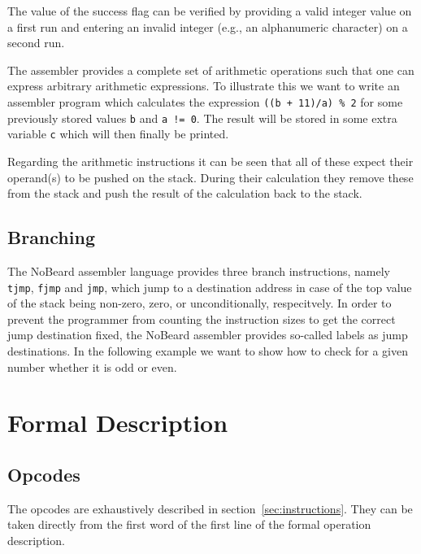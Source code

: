 \documentclass[11pt]{report}
\newcommand{\leongage}{NoBeard}
\begin{document}

The value of the success flag can be verified by providing a valid integer value on a first run and entering an invalid integer (e.g., an alphanumeric character) on a second run.

The assembler provides a complete set of arithmetic operations such that one can express arbitrary arithmetic expressions. To illustrate this we want to write an assembler program which calculates the expression \lstinline$((b + 11)/a) % 2$
for some previously stored values \lstinline$b$ and \lstinline$a != 0$. The result will be stored in some extra variable \lstinline$c$ which will then finally be printed.



Regarding the arithmetic instructions it can be seen that all of these expect their operand(s) to be pushed on the stack. During their calculation they remove these from the stack and push the result of the calculation back to the stack.

\subsection{Branching}
The \leongage{} assembler language provides three branch instructions, namely \lstinline$tjmp$, \lstinline$fjmp$ and \lstinline$jmp$, which jump to a destination address in case of the top value of the stack being non-zero, zero, or unconditionally, respecitvely. In order to prevent the programmer from counting the instruction sizes to get the correct jump destination fixed, the \leongage{} assembler provides so-called labels as jump destinations. In the following example we want to show how to check for a given number whether it is odd or even. 


\section{Formal Description}
\subsection{Opcodes}
The opcodes are exhaustively described in section~\ref{sec:instructions}. They can be taken directly from the first word of the first line of the formal operation description.
\end{document}
